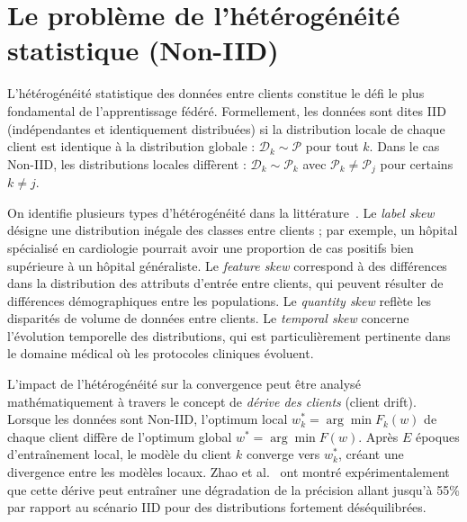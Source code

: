 \documentclass[12pt,a4paper]{report}
\begin{document}
\section{Le probl\`{e}me de l'h\'{e}t\'{e}rog\'{e}n\'{e}it\'{e} statistique (Non-IID)}

L'h\'{e}t\'{e}rog\'{e}n\'{e}it\'{e} statistique des donn\'{e}es entre clients constitue le d\'{e}fi le plus fondamental de l'apprentissage f\'{e}d\'{e}r\'{e}. Formellement, les donn\'{e}es sont dites IID (ind\'{e}pendantes et identiquement distribu\'{e}es) si la distribution locale de chaque client est identique \`{a} la distribution globale : $\mathcal{D}_k \sim \mathcal{P}$ pour tout $k$. Dans le cas Non-IID, les distributions locales diff\`{e}rent : $\mathcal{D}_k \sim \mathcal{P}_k$ avec $\mathcal{P}_k \neq \mathcal{P}_j$ pour certains $k \neq j$.

On identifie plusieurs types d'h\'{e}t\'{e}rog\'{e}n\'{e}it\'{e} dans la litt\'{e}rature~\cite{kairouz2021}. Le \textit{label skew} d\'{e}signe une distribution in\'{e}gale des classes entre clients ; par exemple, un h\^{o}pital sp\'{e}cialis\'{e} en cardiologie pourrait avoir une proportion de cas positifs bien sup\'{e}rieure \`{a} un h\^{o}pital g\'{e}n\'{e}raliste. Le \textit{feature skew} correspond \`{a} des diff\'{e}rences dans la distribution des attributs d'entr\'{e}e entre clients, qui peuvent r\'{e}sulter de diff\'{e}rences d\'{e}mographiques entre les populations. Le \textit{quantity skew} refl\`{e}te les disparit\'{e}s de volume de donn\'{e}es entre clients. Le \textit{temporal skew} concerne l'\'{e}volution temporelle des distributions, qui est particuli\`{e}rement pertinente dans le domaine m\'{e}dical o\`{u} les protocoles cliniques \'{e}voluent.

L'impact de l'h\'{e}t\'{e}rog\'{e}n\'{e}it\'{e} sur la convergence peut \^{e}tre analys\'{e} math\'{e}matiquement \`{a} travers le concept de \textit{d\'{e}rive des clients} (client drift). Lorsque les donn\'{e}es sont Non-IID, l'optimum local $w_k^* = \arg\min F_k(w)$ de chaque client diff\`{e}re de l'optimum global $w^* = \arg\min F(w)$. Apr\`{e}s $E$ \'{e}poques d'entra\^{i}nement local, le mod\`{e}le du client $k$ converge vers $w_k^*$, cr\'{e}ant une divergence entre les mod\`{e}les locaux. Zhao et al.~\cite{zhao2018} ont montr\'{e} exp\'{e}rimentalement que cette d\'{e}rive peut entra\^{i}ner une d\'{e}gradation de la pr\'{e}cision allant jusqu'\`{a} 55\% par rapport au sc\'{e}nario IID pour des distributions fortement d\'{e}s\'{e}quilibr\'{e}es.
\end{document}

